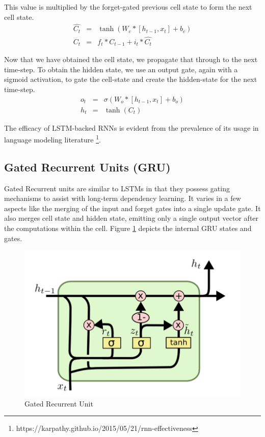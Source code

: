 This value is multiplied by the forget-gated previous cell state to form the next cell state.
\begin{eqnarray*}
    \hat{C_t} &=& \tanh(W_c*[h_{t-1}, x_t] + b_c) \\
    C_t &=& f_t * C_{t-1} + i_t * \hat{C_t}
\end{eqnarray*}

Now that we have obtained the cell state, we propagate that through to the next time-step. To obtain the hidden state, we use an output gate, again with a sigmoid activation, to gate the cell-state and create the hidden-state for the next time-step.
\begin{eqnarray*}
    o_t &=& \sigma(W_o*[h_{t-1}, x_t] + b_o) \\
    h_t &=& \tanh(C_t)
\end{eqnarray*}

The efficacy of LSTM-backed RNNs is evident from the prevalence of its usage in language modeling literature \citep{sundermeyer2012lstm,gers2001lstm,graves2005framewise} \footnote{https://karpathy.github.io/2015/05/21/rnn-effectiveness}.

\subsection{Gated Recurrent Units (GRU)}

Gated Recurrent units \citep{cho2014learning} are similar to LSTMs in that they possess gating mechanisms to assist with long-term dependency learning. It varies in a few aspects like the merging of the input and forget gates into a single update gate. It also merges cell state and hidden state, emitting only a single output vector after the computations within the cell. Figure \ref{fig:gru} depicts the internal GRU states and gates.

\begin{figure}[ht]
	\centering
	\includegraphics[width=\textwidth]{images/gru}
	\caption{\label{fig:gru} Gated Recurrent Unit}
\end{figure}

